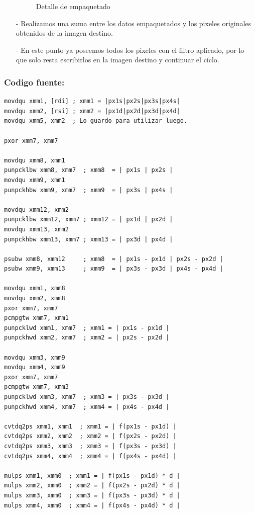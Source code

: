 \documentclass[a4paper]{article}
\newenvironment{codesnippet}{%
	\begin{Sbox}\begin{minipage}{\textwidth}\sffamily\small}%
	{\end{minipage}\end{Sbox}%
		\begin{center}%
		\vspace{-0.4cm}\colorbox{litegrey}{\TheSbox}\end{center}\vspace{0.3cm}}
\begin{document}
\begin{itemize}
\begin{figure}[!htb]
\begin{center}
        	\caption{Detalle de empaquetado}
        	\label{empaquetarPixeles}
          \end{center}
        \end{figure}
    \item[-]
        Realizamos una suma entre los datos empaquetados y los pixeles originales obtenidos de la imagen destino.
    \item[-]
        En este punto ya poseemos todos los pixeles con el filtro aplicado, por lo que solo resta escribirlos en la imagen destino y continuar el ciclo.
\end{itemize}

\subsubsection*{Codigo fuente:}
\begin{codesnippet}
\begin{internallinenumbers}
\begin{verbatim}
movdqu xmm1, [rdi] ; xmm1 = |px1s|px2s|px3s|px4s|
movdqu xmm2, [rsi] ; xmm2 = |px1d|px2d|px3d|px4d|
movdqu xmm5, xmm2  ; Lo guardo para utilizar luego.

pxor xmm7, xmm7

movdqu xmm8, xmm1
punpcklbw xmm8, xmm7  ; xmm8  = | px1s | px2s |
movdqu xmm9, xmm1
punpckhbw xmm9, xmm7  ; xmm9  = | px3s | px4s |

movdqu xmm12, xmm2
punpcklbw xmm12, xmm7 ; xmm12 = | px1d | px2d |
movdqu xmm13, xmm2
punpckhbw xmm13, xmm7 ; xmm13 = | px3d | px4d |

psubw xmm8, xmm12     ; xmm8  = | px1s - px1d | px2s - px2d |
psubw xmm9, xmm13     ; xmm9  = | px3s - px3d | px4s - px4d |

movdqu xmm1, xmm8
movdqu xmm2, xmm8
pxor xmm7, xmm7
pcmpgtw xmm7, xmm1
punpcklwd xmm1, xmm7  ; xmm1 = | px1s - px1d |
punpckhwd xmm2, xmm7  ; xmm2 = | px2s - px2d |

movdqu xmm3, xmm9
movdqu xmm4, xmm9
pxor xmm7, xmm7
pcmpgtw xmm7, xmm3
punpcklwd xmm3, xmm7  ; xmm3 = | px3s - px3d |
punpckhwd xmm4, xmm7  ; xmm4 = | px4s - px4d |

cvtdq2ps xmm1, xmm1  ; xmm1 = | f(px1s - px1d) |
cvtdq2ps xmm2, xmm2  ; xmm2 = | f(px2s - px2d) |
cvtdq2ps xmm3, xmm3  ; xmm3 = | f(px3s - px3d) |
cvtdq2ps xmm4, xmm4  ; xmm4 = | f(px4s - px4d) |

mulps xmm1, xmm0  ; xmm1 = | f(px1s - px1d) * d |
mulps xmm2, xmm0  ; xmm2 = | f(px2s - px2d) * d |
mulps xmm3, xmm0  ; xmm3 = | f(px3s - px3d) * d |
mulps xmm4, xmm0  ; xmm4 = | f(px4s - px4d) * d |


\end{verbatim}
\end{internallinenumbers}
\end{codesnippet}
\end{document}
